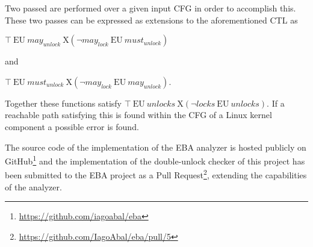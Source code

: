 \newpar Two passed are performed over a given input CFG in order to accomplish this. These two passes can be expressed as extensions to the aforementioned CTL as 
\begin{center}
    $\top\:\mathrm{EU}\:may_{unlock}\:\mathrm{X}(\neg may_{lock} \:\mathrm{EU}\:must_{unlock})$ 

    and 

    $\top\:\mathrm{EU}\:must_{unlock}\:\mathrm{X}(\neg may_{lock} \:\mathrm{EU}\:may_{unlock})$. 
\end{center}

\newpar Together these functions satisfy $\top\:\mathrm{EU}\:unlocks\:\mathrm{X}(\neg locks\:\mathrm{EU}\:unlocks)$. If a reachable path satisfying this is found within the CFG of a Linux kernel component a possible error is found.

\newpar The source code of the implementation of the EBA analyzer is hosted publicly  on GitHub\footnote{\url{https://github.com/iagoabal/eba}} and the implementation of the double-unlock checker of this project has been submitted to the EBA project as a Pull Request\footnote{\url{https://github.com/IagoAbal/eba/pull/5}}, extending the capabilities of the analyzer. 